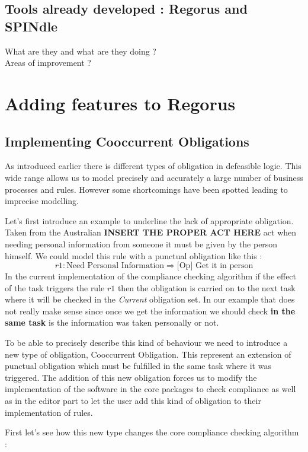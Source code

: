 \documentclass[10pt]{report}
\begin{document}
\subsection{Tools already developed : Regorus and SPINdle}
What are they and what are they doing ?\\
Areas of improvement ?


\newpage
\section{Adding features to Regorus}
\subsection{Implementing Cooccurrent Obligations}
As introduced earlier there is different types of obligation in defeasible logic. This wide range allows us to model precisely and accurately a large number of business processes and rules. However some shortcomings have been spotted leading to imprecise modelling.

Let's first introduce an example to underline the lack of appropriate obligation. Taken from the Australian \textbf{INSERT THE PROPER ACT HERE} act when needing personal information from someone it must be given by the person himself. We could model this rule with a punctual obligation like this :
\begin{equation}
r1 : \text{Need Personal Information} \Rightarrow \text{[Op] Get it in person}
\end{equation}
In the current implementation of the compliance checking algorithm if the effect of the task triggers the rule $r1$ then the obligation is carried on to the next task where it will be checked in the \textit{Current} obligation set. In our example that does not really make sense since once we get the information we should check \textbf{in the same task} is the information was taken personally or not.

To be able to precisely describe this kind of behaviour we need to introduce a new type of obligation, Cooccurrent Obligation. This represent an extension of punctual obligation which must be fulfilled in the same task where it was triggered. The addition of this new obligation forces us to modify the implementation of the software in the core packages to check compliance as well as in the editor part to let the user add this kind of obligation to their implementation of rules.

First let's see how this new type changes the core compliance checking algorithm :
\end{document}
